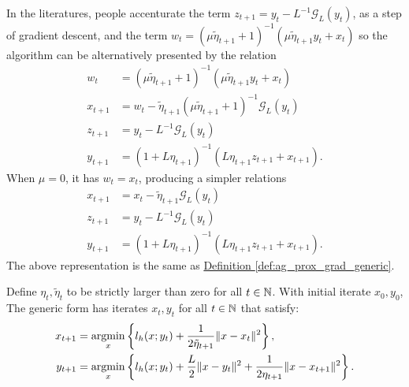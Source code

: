 \documentclass[12pt]{article}
\begin{document}
    \begin{remark}\label{remark:generic_s-cvx_ppm_alternative_representation}
        In the literatures, people accenturate the term $z_{t + 1} = y_t - L^{-1} \mathcal G_L(y_t)$, as a step of gradient descent, and the term $w_t = (\mu\tilde \eta_{t + 1} + 1)^{-1}(\mu\tilde \eta_{t + 1}y_t + x_t)$ so the algorithm can be alternatively presented by the relation 
        \begin{align*}
            w_{t} &= (\mu\tilde \eta_{t + 1} + 1)^{-1}(\mu \tilde \eta_{t + 1} y_t + x_t) 
            \\
            x_{t + 1}&= w_t - \tilde \eta_{t + 1}(\mu\tilde \eta_{t + 1} + 1)^{-1} \mathcal G_L(y_t)
            \\
            z_{t + 1}&= y_t - L^{-1}\mathcal G_L(y_t)
            \\
            y_{t + 1} &= (1 + L\eta_{t + 1})^{-1}(L\eta_{t + 1}z_{t + 1} + x_{t + 1}). 
        \end{align*}
        When $\mu = 0$, it has $w_t = x_t$, producing a simpler relations 
        \begin{align*}
            x_{t + 1} &= 
            x_t - \tilde \eta_{t + 1} \mathcal G_L(y_t)
            \\
            z_{t + 1}&= y_t - L^{-1}\mathcal G_L(y_t)
            \\
            y_{t + 1} &= (1 + L\eta_{t + 1})^{-1}
            (L\eta_{t + 1} z_{t + 1} + x_{t + 1}). 
        \end{align*}
        The above representation is the same as 
        \hyperref[def:ag_prox_grad_generic]{Definition \ref*{def:ag_prox_grad_generic}}. 

    \end{remark}
    
    \begin{definition}
    \label{def:ag_prox_grad_ppm}
        Define $\eta_t, \tilde \eta_t$ to be strictly larger than zero for all $t \in \mathbb N$. 
        With initial iterate $x_0, y_0$, 
        The generic form has iterates $x_t, y_t$ for all $t \in \mathbb N$ that satisfy: 
        $$
        \begin{aligned}
            x_{t + 1} &= \mathop{\rm argmin}\limits_{x} \left\lbrace
                l_h(x; y_t) + \frac{1}{2\tilde \eta_{t + 1}} 
                \Vert x - x_t\Vert^2
            \right\rbrace,
            \\
            y_{t + 1}&= 
            \mathop{\rm argmin}\limits_{x}
            \left\lbrace
                l_h(x; y_t) + \frac{L}{2}\Vert x - y_t\Vert^2 + 
                \frac{1}{2\eta_{t + 1}} \Vert x - x_{t + 1}\Vert^2
            \right\rbrace.
        \end{aligned}
        $$
    \end{definition}
\end{document}
